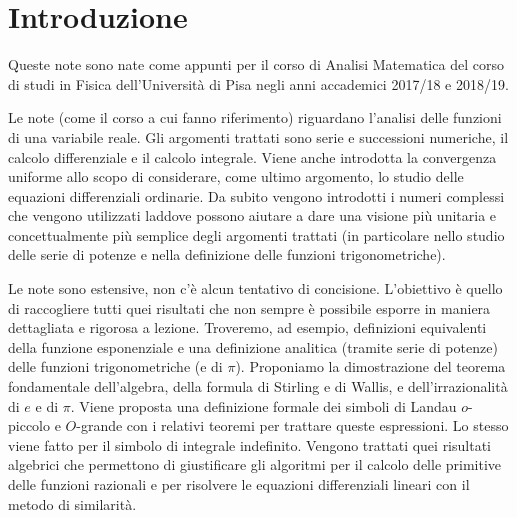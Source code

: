 \chapter*{Introduzione}


Queste note sono nate come appunti per il corso di Analisi Matematica %
del corso di studi in Fisica dell'Università %
di Pisa negli anni accademici 2017/18 e 2018/19. %

Le note (come il corso a cui fanno riferimento) %
riguardano l'analisi delle funzioni di una variabile %
reale. %
Gli argomenti trattati sono serie e successioni numeriche, %
il calcolo differenziale e il calcolo integrale. %
Viene anche introdotta la convergenza uniforme allo scopo di considerare, %
come ultimo argomento, lo studio delle equazioni differenziali ordinarie. %
Da subito vengono introdotti i numeri complessi che vengono utilizzati %
laddove possono aiutare a dare una visione più unitaria e concettualmente %
più semplice degli argomenti trattati (in particolare nello studio delle serie %
di potenze e nella definizione delle funzioni trigonometriche). %

Le note sono estensive, non c'è alcun tentativo di concisione. %
L'obiettivo è quello di raccogliere tutti quei risultati che non sempre è %
possibile esporre in maniera dettagliata e rigorosa a lezione. %
Troveremo, ad esempio, %
definizioni equivalenti della funzione esponenziale e una definizione %
analitica (tramite serie di potenze) %
delle funzioni trigonometriche (e di $\pi$). %
Proponiamo la dimostrazione del teorema fondamentale dell'algebra, %
della formula di Stirling e di Wallis, %
e dell'irrazionalità di $e$ e di $\pi$. %
Viene proposta una definizione formale dei simboli di Landau %
$o$-piccolo e $O$-grande con i relativi teoremi per trattare queste espressioni. %
Lo stesso viene fatto per il simbolo di integrale indefinito. %
Vengono trattati quei risultati algebrici che permettono di %
giustificare gli algoritmi per il calcolo delle primitive %
delle funzioni razionali e per risolvere le equazioni differenziali %
lineari con il metodo di similarità. %


